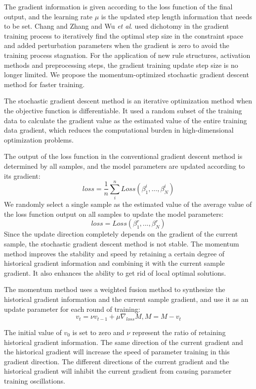\documentclass{ieeeaccess}
\begin{document}
The gradient information is given according to the loss function of the final output, and the learning rate $\mu$ is the updated step length information that needs to be set.
Chang and Zhang\cite{a11} and Wu \textit{et al}.\cite{a13} used dichotomy in the gradient training process to iteratively find the optimal step size in the constraint space and
added perturbation parameters when the gradient is zero to avoid the training process stagnation.
For the application of new rule structures, activation methods and preprocessing steps, the gradient training update step size is no longer limited.
We propose the momentum-optimized stochastic gradient descent method for faster training.

The stochastic gradient descent method is an iterative optimization method when the objective function is differentiable.
It used a random subset of the training data to calculate the gradient value as the estimated value of the entire training data gradient,
which reduces the computational burden in high-dimensional optimization problems.

The output of the loss function in the conventional gradient descent method is determined by all samples,
and the model parameters are updated according to its gradient:
\begin{equation}
    loss=\frac{1}{n}\sum_i^nLoss(\beta_1^i,...,\beta_N^i)
\end{equation}
We randomly select a single sample as the estimated value of the average value of the loss function output on all samples to update the model parameters:
\begin{equation}
    loss=Loss(\beta_1^r,...,\beta_N^r)
\end{equation}
Since the update direction completely depends on the gradient of the current sample, the stochastic gradient descent method is not stable.
The momentum method improves the stability and speed by retaining a certain degree of historical gradient information and combining it with the current sample gradient.
It also enhances the ability to get rid of local optimal solutions.

The momentum method uses a weighted fusion method to synthesize the historical gradient information and the current sample gradient,
and use it as an update parameter for each round of training:
\begin{equation}
    v_t=\nu v_{t-1}+\mu\nabla_{loss}M,M=M-v_t
\end{equation}

The initial value of $v_0$ is set to zero and $\nu$ represent the ratio of retaining historical gradient information.
The same direction of the current gradient and the historical gradient will increase the speed of parameter training in this gradient direction.
The different directions of the current gradient and the historical gradient will inhibit the current gradient from causing parameter training oscillations.
\end{document}
